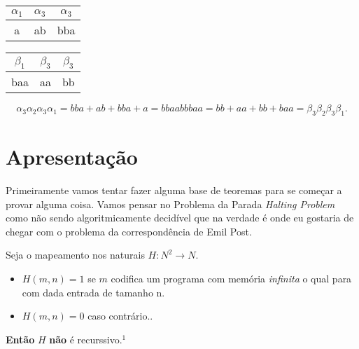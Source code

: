 \documentclass[12pt, a4paper]{article}
\begin{document}
\begin{table}[ht]
\begin{minipage}[b]{0.45\linewidth}\centering
\begin{tabular}{|c|c|c|}
\hline
$\alpha_1$ & $\alpha_3$ & $\alpha_3$ \\
\hline
a & ab & bba \\
\hline
\end{tabular}
\end{minipage}
\hspace{0.5cm}
\begin{minipage}[b]{0.45\linewidth}
\centering
\begin{tabular}{|c|c|c|}
\hline
$\beta_1$ & $\beta_3$ & $\beta_3$ \\
\hline
baa & aa & bb \\
\hline
\end{tabular}
\end{minipage}
$$\alpha_3 \alpha_2 \alpha_3 \alpha_1 = bba + ab + bba + a = bbaabbbaa = bb + aa + bb + baa = \beta_{3} \beta_{2} \beta_{3} \beta_{1}.$$
\end{table}

\pagebreak
\section{Apresentação}


\qquad Primeiramente vamos tentar fazer alguma base de teoremas para se começar a provar alguma coisa. Vamos pensar no Problema da Parada \textit{Halting Problem} como não sendo algoritmicamente decidível que na verdade é onde eu gostaria de chegar com o problema da correspondência de Emil Post.

\quad Seja o mapeamento nos naturais $H: N^2 \rightarrow N$.

\begin{itemize}
\item $H \left({m, n}\right) = 1$ se $m$ codifica um programa com memória \textit{infinita} o qual para com dada entrada de tamanho n.
\item$H \left({m, n}\right) = 0$ caso contrário..
\end{itemize}

\quad \textbf{Então} $H$ \textbf{não} é recurssivo.\href{http://www.proofwiki.org/wiki/Halting_Problem_is_Not_Algorithmically_Decidable}{$^1$}
\end{document}
